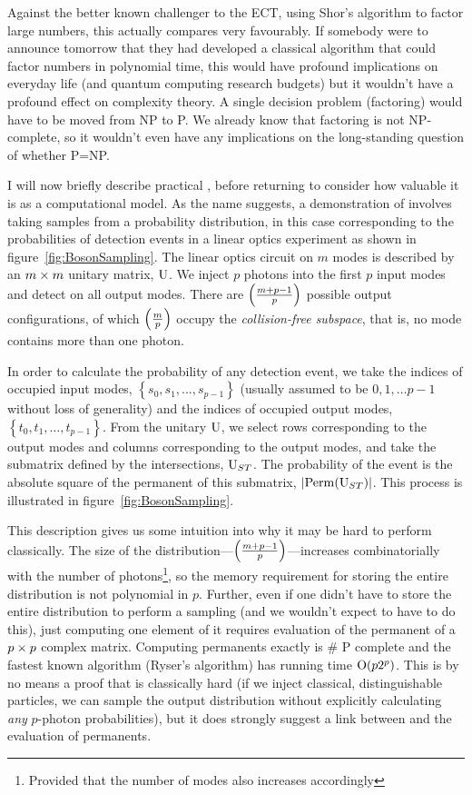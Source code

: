 Against the better known challenger to the ECT, using Shor's algorithm to factor
large numbers, this actually compares very favourably. If somebody were to
announce tomorrow that they had developed a classical algorithm that could
factor numbers in polynomial time, this would have profound implications on
everyday life (and quantum computing research budgets) but it wouldn't have a
profound effect on complexity theory. A single decision problem (factoring)
would have to be moved from NP to P. We already know that factoring is not
NP-complete, so it wouldn't even have any implications on the long-standing
question of whether P=NP.

I will now briefly describe practical \bosonsampling{}, before returning to
consider how valuable it is as a computational model. As the name suggests, a
demonstration of \bosonsampling{} involves taking samples from a probability
distribution, in this case corresponding to the probabilities of detection
events in a linear optics experiment as shown in figure~\ref{fig:BosonSampling}.
The linear optics circuit on \(m\) modes is described by an \(m \times m\) unitary
matrix, \(\mathrm{U}\). We inject \(p\) photons into the first \(p\) input modes
and detect on all output modes. There are \(\left( \frac{m+p-1}{p} \right)\) possible output
configurations, of which \(\left( \frac{m}{p} \right)\) occupy the \emph{collision-free
subspace}, that is, no mode contains more than one photon.

In order to calculate the probability of any detection event, we take the
indices of occupied input modes, \(\left\{ s_{0}, s_{1}, \dots, s_{p-1} \right\}
\) (usually assumed to be \(0, 1, \dots p-1\) without loss of generality) and
the indices of occupied output modes, \(\left\{ t_{0}, t_{1}, \dots, t_{p-1}
\right\}\). From the unitary \(\mathrm{U}\), we select rows corresponding to the
output modes and columns corresponding to the output modes, and take the
submatrix defined by the intersections, \(\mathrm{U}_{ST}\). The probability of the
event is the absolute square of the permanent of this submatrix, \(\left|
\mathrm{Perm} \!\left( \mathrm{U}_{ST} \right)\right| \). This process is illustrated in
figure~\ref{fig:BosonSampling}.

This description gives us some intuition into why it may be hard to perform
\bosonsampling{} classically. The size of the distribution---\( \left( \frac{m+p-1}{p} \right)
\)---increases combinatorially with the number of photons\footnote{Provided that
the number of modes also increases accordingly}, so the memory requirement for
storing the entire distribution is not polynomial in \(p\). Further, even if one
didn't have to store the entire distribution to perform a sampling (and we
wouldn't expect to have to do this), just computing one element of it requires
evaluation of the permanent of a \(p \times p\) complex matrix. Computing
permanents exactly is \# P complete \cite{valiant} and the fastest known
algorithm (Ryser's algorithm) has running time \(\mathrm{O} \!\left( p 2^{p} \right)\). This is
by no means a proof that \bosonsampling{} is classically hard (if we inject
classical, distinguishable particles, we can sample the output distribution
without explicitly calculating \emph{any} \(p\)-photon probabilities), but it
does strongly suggest a link between \bosonsampling{} and the evaluation of
permanents.


